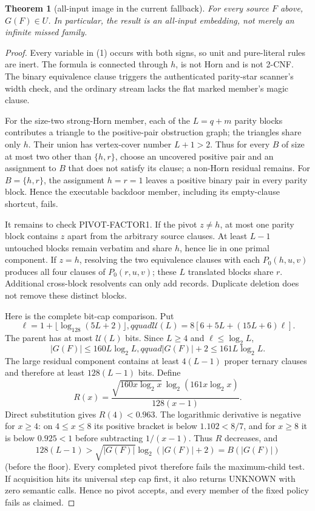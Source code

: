 \documentclass[11pt]{article}
\newtheorem{theorem}{Theorem}
\begin{document}
\begin{theorem}[all-input image in the current fallback]\label{thm:miss}
For every source $F$ above, $G(F)\in U$.  In particular, the result is an
all-input embedding, not merely an infinite missed family.
\end{theorem}
\begin{proof}
Every variable in (1) occurs with both signs, so unit and pure-literal rules
are inert.  The formula is connected through $h$, is not Horn and is not
2-CNF.  The binary equivalence clause triggers the authenticated parity-star
scanner's width check, and the ordinary stream lacks the flat marked
member's magic clause.

For the size-two strong-Horn member, each of the $L=q+m$ parity blocks
contributes a triangle to the positive-pair obstruction graph; the triangles
share only $h$.  Their union has vertex-cover number $L+1>2$.  Thus for every
$B$ of size at most two other than $\{h,r\}$, choose an uncovered positive
pair and an assignment to $B$ that does not satisfy its clause; a non-Horn
residual remains.  For $B=\{h,r\}$, the assignment $h=r=1$ leaves a positive
binary pair in every parity block.  Hence the executable backdoor member,
including its empty-clause shortcut, fails.

It remains to check \textsc{PIVOT-FACTOR1}.  If the pivot $z\ne h$, at most
one parity block contains $z$ apart from the arbitrary source clauses.
At least $L-1$ untouched blocks remain verbatim and share $h$, hence lie in
one primal component.  If $z=h$, resolving the two equivalence clauses with
each $P_0(h,u,v)$ produces all four clauses of $P_0(r,u,v)$; these $L$
translated blocks share $r$.  Additional cross-block resolvents can only add
records.  Duplicate deletion does not remove these distinct blocks.

Here is the complete bit-cap comparison.  Put
\[
 \ell=1+\lfloor\log_{128}(5L+2)\rfloor,qquad
 \mathcal U(L)=8[6+5L+(15L+6)\ell].                       \tag{4}
\]
The parent has at most $\mathcal U(L)$ bits.  Since $L\ge4$ and
$\ell\le\log_2L$,
\[
 |G(F)|\le160L\log_2L,qquad |G(F)|+2\le161L\log_2L.       \tag{5}
\]
The large residual component contains at least $4(L-1)$ proper ternary
clauses and therefore at least $128(L-1)$ bits.  Define
\[
 R(x)=\frac{\sqrt{160x\log_2x}\,
              \log_2(161x\log_2x)}{128(x-1)}.
\]
Direct substitution gives $R(4)<0.963$.  The logarithmic derivative is
negative for $x\ge4$: on $4\le x\le8$ its positive bracket is below
$1.102<8/7$, and for $x\ge8$ it is below $0.925<1$ before subtracting
$1/(x-1)$.  Thus $R$ decreases, and
\[
 128(L-1)>\sqrt{|G(F)|}\log_2(|G(F)|+2)=B(|G(F)|)          \tag{6}
\]
(before the floor).  Every completed pivot therefore fails the maximum-child
test.  If acquisition hits its universal step cap first, it also returns
UNKNOWN with zero semantic calls.  Hence no pivot accepts, and every member
of the fixed policy fails as claimed.
\end{proof}
\end{document}
